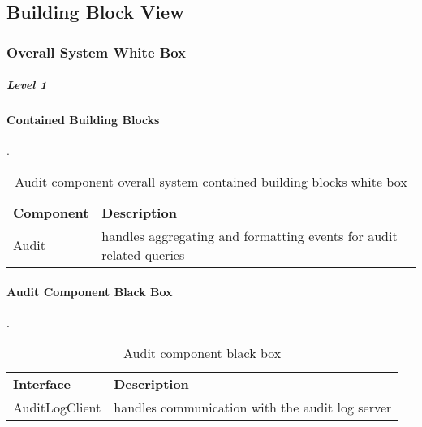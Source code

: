 \subsection{Building Block View}

\subsubsection{Overall System White Box}


\subparagraph{Level 1}

\paragraph{Contained Building Blocks}.

\begin{table}[H]
  \begin{center}
    \caption{Audit component overall system contained building blocks white box}
    \label{tab:acoscbbwb}
    \def\arraystretch{1.5}
    \begin{tabularx}{\linewidth}{|l X |}
      \hline
      \rowcolor{gray!20}
      \textbf{Component} & \textbf{Description}\\
      Audit & handles aggregating and formatting events for audit related queries\\
      \hline
    \end{tabularx}
  \end{center}
\end{table}

\paragraph{Audit Component Black Box}.

\begin{table}[H]
  \begin{center}
    \caption{Audit component black box}
    \label{tab:acbb}
    \def\arraystretch{1.5}
    \begin{tabularx}{\linewidth}{|l X |}
      \hline
      \rowcolor{gray!20}
      \textbf{Interface} & \textbf{Description}\\
      AuditLogClient & handles communication with the audit log server\\
      \hline
    \end{tabularx}
  \end{center}
\end{table}

